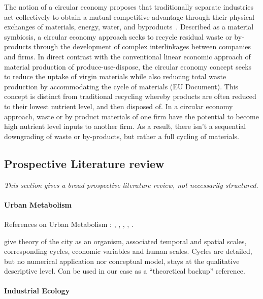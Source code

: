 \documentclass[fleqn,10pt]{wlscirep}
\begin{document}
The notion of a circular economy proposes that traditionally separate industries act collectively to obtain a mutual competitive advantage through their physical exchanges of materials, energy, water, and byproducts~\cite{chertow2000industrial}. Described as a material symbiosis, a circular economy approach seeks to recycle residual waste or by-products through the development of complex interlinkages between companies and firms.  In direct contrast with the conventional linear economic approach of material production of produce-use-dispose, the circular economy concept seeks to reduce the uptake of virgin materials while also reducing total waste production by accommodating the cycle of materials (EU Document). This concept is distinct from traditional recycling whereby products are often reduced to their lowest nutrient level, and then disposed of. In a circular economy approach, waste or by product materials of one firm have the potential to become high nutrient level inputs to another firm. As a result, there isn’t a sequential downgrading of waste or by-products, but rather a full cycling of materials. 


\subsection{Prospective Literature review}


\textit{This section gives a broad prospective literature review, not necessarily structured.}

\paragraph{Urban Metabolism}

References on Urban Metabolism : \cite{kennedy2007changing}, \cite{kennedy2011study}, \cite{newcombe1978metabolism}, \cite{bodini2012cities}, \cite{hoornwegmainstreaming}.

\cite{olsen1982urban} give theory of the city as an organism, associated temporal and spatial scales, corresponding cycles, economic variables and human scales. Cycles are detailed, but no numerical application nor conceptual model, stays at the qualitative descriptive level. Can be used in our case as a “theoretical backup” reference.


\paragraph{Industrial Ecology}
\end{document}
